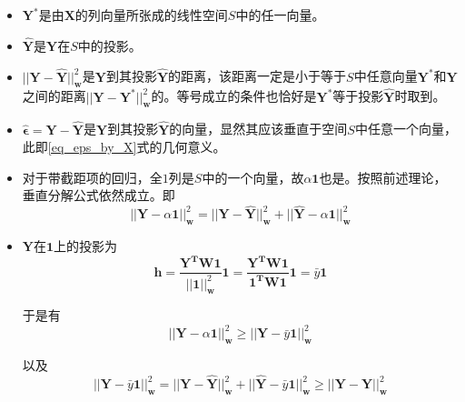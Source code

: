 \begin{itemize}
    \item $\bm{Y^*}$是由$\bm{X}$的列向量所张成的线性空间$S$中的任一向量。
    \item $\bm{\hat{Y}}$是$\bm{Y}$在$S$中的投影。
    \item $|| \bm{Y} - \bm{\hat{Y}} ||_{\bm{w}}^2$是$\bm{Y}$到其投影$\bm{\hat{Y}}$的距离，该距离一定是小于等于$S$中任意向量$\bm{Y^*}$和$\bm{Y}$之间的距离$||\bm{Y} - \bm{Y^*}||_{\bm{w}}^2$的。等号成立的条件也恰好是$\bm{Y^*}$等于投影$\bm{\hat{Y}}$时取到。
    \item $\bm{\hat{\epsilon}} = \bm{Y} - \bm{\hat{Y}}$是$\bm{Y}$到其投影$\bm{\hat{Y}}$的向量，显然其应该垂直于空间$S$中任意一个向量，此即\ref{eq_eps_by_X}式的几何意义。
    \item 对于带截距项的回归，全$1$列是$S$中的一个向量，故$\alpha\bm{1}$也是。按照前述理论，垂直分解公式依然成立。即
          \begin{equation}
              ||\bm{Y} - \alpha\bm{1}||_{\bm{w}}^2 =|| \bm{Y} - \bm{\hat{Y}} ||_{\bm{w}}^2 + || \bm{\hat{Y}} - \alpha \bm{1}||_{\bm{w}}^2
          \end{equation}
    \item $\bm{Y}$在$\bm{1}$上的投影为
          \begin{equation}
              \bm{h} = \frac{\bm{Y^TW1}}{||\bm{1}||_{\bm{w}}^2} \bm{1} = \frac{\bm{Y^TW1}}{\bm{1^TW1}} \bm{1} = \bar{y}\bm{1}
          \end{equation}

          于是有
          \begin{equation}
              ||\bm{Y} - \alpha\bm{1}||_{\bm{w}}^2 \geq ||\bm{Y} - \bar{y}\bm{1}||_{\bm{w}}^2
          \end{equation}

          以及
          \begin{equation}
              ||\bm{Y} - \bar{y}\bm{1}||_{\bm{w}}^2 =||\bm{Y} - \bm{\hat{Y}}||_{\bm{w}}^2 + || \bm{\hat{Y}} - \bar{y}\bm{1}||_{\bm{w}}^2 \geq ||\bm{Y} - \bm{\hat{Y}}||_{\bm{w}}^2
          \end{equation}
\end{itemize}